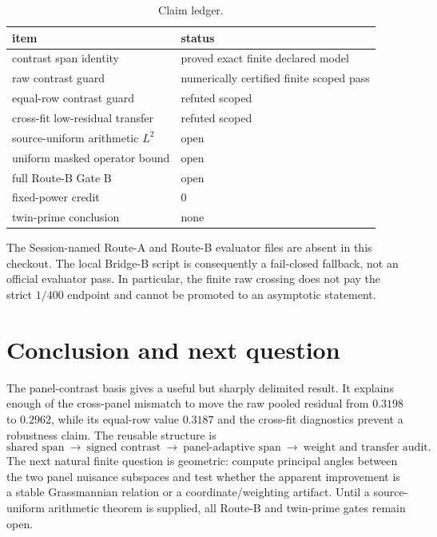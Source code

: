 \documentclass[11pt]{article}
\begin{document}
\begin{table}[ht]
\centering
\caption{Claim ledger.}
\begin{tabular}{ll}
\toprule
item & status\\
\midrule
contrast span identity & proved exact finite declared model\\
raw contrast guard & numerically certified finite scoped pass\\
equal-row contrast guard & refuted scoped\\
cross-fit low-residual transfer & refuted scoped\\
source-uniform arithmetic $L^2$ & open\\
uniform masked operator bound & open\\
full Route-B Gate B & open\\
fixed-power credit & 0\\
twin-prime conclusion & none\\
\bottomrule
\end{tabular}
\end{table}

The Session-named Route-A and Route-B evaluator files are absent in this
checkout.  The local Bridge-B script is consequently a fail-closed fallback,
not an official evaluator pass.  In particular, the finite raw crossing does
not pay the strict $1/400$ endpoint and cannot be promoted to an asymptotic
statement.

\section{Conclusion and next question}

The panel-contrast basis gives a useful but sharply delimited result.  It
explains enough of the cross-panel mismatch to move the raw pooled residual
from $0.3198$ to $0.2962$, while its equal-row value $0.3187$ and the cross-fit
diagnostics prevent a robustness claim.  The reusable structure is
\[
\text{shared span}\ \longrightarrow\ \text{signed contrast}\ \longrightarrow\
\text{panel-adaptive span}\ \longrightarrow\ \text{weight and transfer audit}.
\]
The next natural finite question is geometric: compute principal angles
between the two panel nuisance subspaces and test whether the apparent
improvement is a stable Grassmannian relation or a coordinate/weighting
artifact.  Until a source-uniform arithmetic theorem is supplied, all Route-B
and twin-prime gates remain open.
\end{document}
